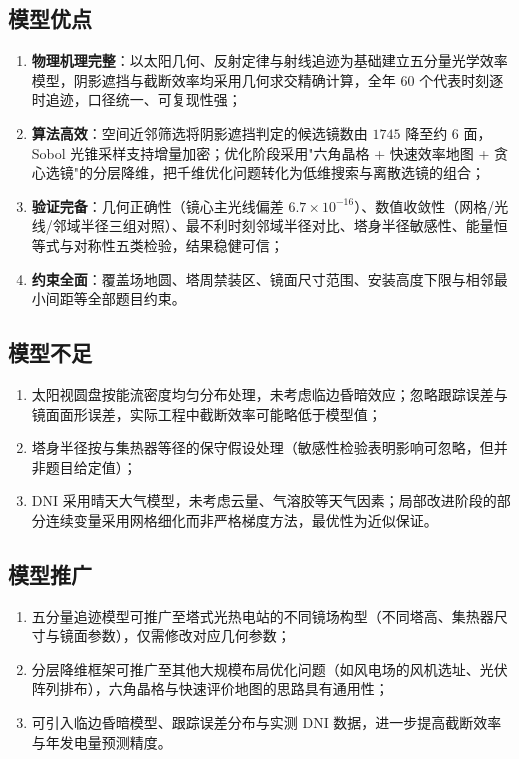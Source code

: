 \documentclass[12pt,a4paper,fontset=fandol]{ctexart}
\begin{document}
\subsection{模型优点}
\begin{enumerate}
    \item \textbf{物理机理完整}：以太阳几何、反射定律与射线追迹为基础建立五分量光学效率模型，阴影遮挡与截断效率均采用几何求交精确计算，全年 $60$ 个代表时刻逐时追迹，口径统一、可复现性强；
    \item \textbf{算法高效}：空间近邻筛选将阴影遮挡判定的候选镜数由 $1745$ 降至约 $6$ 面，Sobol 光锥采样支持增量加密；优化阶段采用"六角晶格 + 快速效率地图 + 贪心选镜"的分层降维，把千维优化问题转化为低维搜索与离散选镜的组合；
    \item \textbf{验证完备}：几何正确性（镜心主光线偏差 $6.7\times10^{-16}$）、数值收敛性（网格/光线/邻域半径三组对照）、最不利时刻邻域半径对比、塔身半径敏感性、能量恒等式与对称性五类检验，结果稳健可信；
    \item \textbf{约束全面}：覆盖场地圆、塔周禁装区、镜面尺寸范围、安装高度下限与相邻最小间距等全部题目约束。
\end{enumerate}

\subsection{模型不足}
\begin{enumerate}
    \item 太阳视圆盘按能流密度均匀分布处理，未考虑临边昏暗效应；忽略跟踪误差与镜面面形误差，实际工程中截断效率可能略低于模型值；
    \item 塔身半径按与集热器等径的保守假设处理（敏感性检验表明影响可忽略，但并非题目给定值）；
    \item DNI 采用晴天大气模型，未考虑云量、气溶胶等天气因素；局部改进阶段的部分连续变量采用网格细化而非严格梯度方法，最优性为近似保证。
\end{enumerate}

\subsection{模型推广}
\begin{enumerate}
    \item 五分量追迹模型可推广至塔式光热电站的不同镜场构型（不同塔高、集热器尺寸与镜面参数），仅需修改对应几何参数；
    \item 分层降维框架可推广至其他大规模布局优化问题（如风电场的风机选址、光伏阵列排布），六角晶格与快速评价地图的思路具有通用性；
    \item 可引入临边昏暗模型、跟踪误差分布与实测 DNI 数据，进一步提高截断效率与年发电量预测精度。
\end{enumerate}
\end{document}
